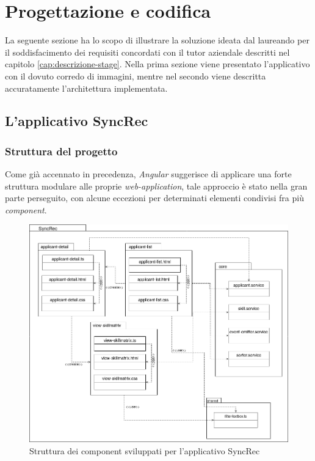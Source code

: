 
\chapter{Progettazione e codifica}
\label{cap:progettazione-codifica}

La seguente sezione ha lo scopo di illustrare la soluzione ideata dal laureando per il soddisfacimento dei requisiti concordati con il tutor aziendale descritti nel capitolo \ref{cap:descrizione-stage}. Nella prima sezione viene presentato l'applicativo con il dovuto corredo di immagini, mentre nel secondo viene descritta accuratamente l'architettura implementata.


\section{L'applicativo SyncRec}
\subsection{Struttura del progetto}
Come già accennato in precedenza, \textit{Angular} suggerisce di applicare una forte struttura modulare alle proprie \textit{web-application}, tale approccio è stato nella gran parte perseguito, con alcune eccezioni per determinati elementi condivisi fra più \textit{component}.

\begin{figure}[!h] 
	\centering 
	\includegraphics[width=1\columnwidth]{immagini/usecase/UML1} 
	\caption{Struttura dei component sviluppati per l'applicativo SyncRec}
	\label{figura:UML1}
\end{figure}

